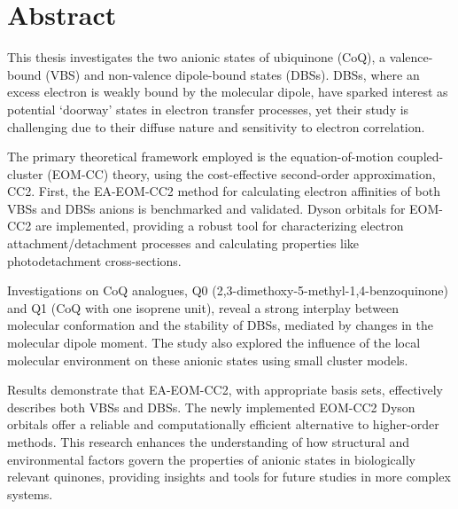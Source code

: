 \chapter*{Abstract}                                 \label{ch:abstract}


This thesis investigates the two anionic states of ubiquinone (CoQ), a valence-bound (VBS) and non-valence dipole-bound states (DBSs). DBSs, where an excess electron is weakly bound by the molecular dipole, have sparked interest as potential `doorway' states in electron transfer processes, yet their study is challenging due to their diffuse nature and sensitivity to electron correlation.

The primary theoretical framework employed is the equation-of-motion coupled-cluster (EOM-CC) theory, using the cost-effective second-order approximation, CC2. First, the EA-EOM-CC2 method for calculating electron affinities of both VBSs and DBSs anions is benchmarked and validated. Dyson orbitals for EOM-CC2 are implemented, providing a robust tool for characterizing electron attachment/detachment processes and calculating properties like photodetachment cross-sections.

Investigations on CoQ analogues, Q0 (2,3-dimethoxy-5-methyl-1,4-benzoquinone) and Q1 (CoQ with one isoprene unit), reveal a strong interplay between molecular conformation and the stability of DBSs, mediated by changes in the molecular dipole moment. The study also explored the influence of the local molecular environment on these anionic states using small cluster models.

Results demonstrate that EA-EOM-CC2, with appropriate basis sets, effectively describes both VBSs and DBSs. The newly implemented EOM-CC2 Dyson orbitals offer a reliable and computationally efficient alternative to higher-order methods. This research enhances the understanding of how structural and environmental factors govern the properties of anionic states in biologically relevant quinones, providing insights and tools for future studies in more complex systems.

\cleardoublepage

